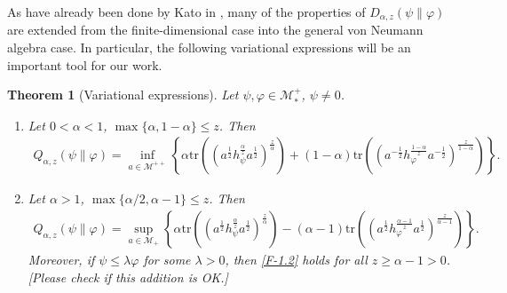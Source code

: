 \documentclass[12pt]{article}
\newtheorem{theorem}{Theorem}[section]
\theoremstyle{definition}
\theoremstyle{remark}
\numberwithin{equation}{section}
\def\Me{\mathcal M}
\def\Tr{\mathrm{tr}}
\def\ffi{\varphi}
\begin{document}
{\color{red}As have already been done by Kato in \cite{kato2023onrenyi}, many of the properties of
$D_{\alpha,z}(\psi\|\varphi)$ are extended from the finite-dimensional case into the general von Neumann
algebra case}. In particular, the following variational expressions will be an important tool for our work.

\begin{theorem}[Variational expressions]\label{thm:variational} Let $\psi,\varphi\in \Me_*^+$, $\psi\ne 0$. 
\begin{enumerate}
\item[(i)] Let $0<\alpha<1$, $\max\{\alpha,1-\alpha\}\le z$. Then
\begin{align}\label{F-1.1}
Q_{\alpha,z}(\psi\|\varphi)=\inf_{a\in \Me^{++}}\left\{\alpha
\Tr\left((a^{\frac12}h_\psi^{\frac{\alpha}{z}}a^{\frac12})^{\frac{z}{\alpha}}\right)+(1-\alpha)
\Tr\left((a^{-\frac12}h_\varphi^{\frac{1-\alpha}{z}}a^{-\frac12})^{\frac{z}{1-\alpha}}\right) \right\}.
\end{align}

\item[(ii)] Let $\alpha>1$, $\max\{\alpha/2,\alpha-1\}\le z$. Then
\begin{align}\label{F-1.2}
Q_{\alpha,z}(\psi\|\varphi)=\sup_{a\in \Me_+} \left\{\alpha
\Tr\left((a^{\frac12}h_\psi^{\frac{\alpha}{z}}a^{\frac12})^{\frac{z}{\alpha}}\right)-(\alpha-1)
\Tr\left((a^{\frac12}h_\varphi^{\frac{\alpha-1}{z}}a^{\frac12})^{\frac{z}{\alpha-1}}\right) \right\}.
\end{align}
{\color{red}Moreover, if $\psi\le\lambda\ffi$ for some $\lambda>0$, then \eqref{F-1.2} holds for all
$z\ge\alpha-1>0$. [Please check if this addition is OK.]}
\end{enumerate}
\end{theorem}
\end{document}
